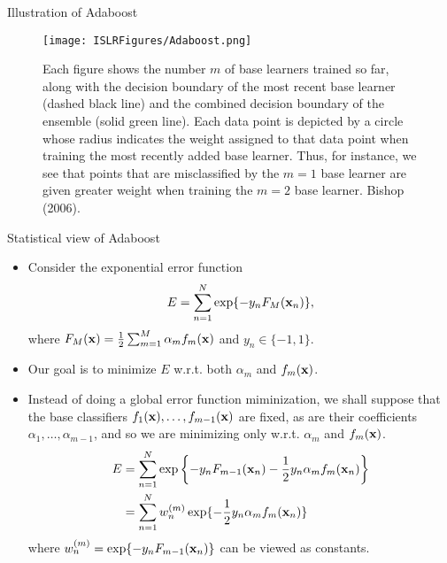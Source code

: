 \documentclass{beamer}
\def\bfx{{\bf x}}
\begin{document}
                     \begin{frame}{Illustration of Adaboost}

                      \begin{figure}
                        \centering
                        
                        \centering
                        \texttt{[image: ISLRFigures/Adaboost.png]}
                        \caption{\footnotesize Each figure shows the number $m$ of base learners trained so far, along with the decision
boundary of the most recent base learner (dashed black line) and the combined decision boundary of the ensemble
(solid green line). Each data point is depicted by a circle whose radius indicates the weight assigned to
that data point when training the most recently added base learner. Thus, for instance, we see that points that
are misclassified by the $m = 1$ base learner are given greater weight when training the $m = 2$ base learner. Bishop (2006).
                        }
                      \end{figure}

                     \end{frame}

                    

                     \begin{frame}{Statistical view of Adaboost}
                     \begin{itemize}\footnotesize
                      \item Consider the exponential error function 
                      \begin{align}\label{exp_loss}
                      E = \sum^N_{n=1} \exp\{-y_n F_M(\bfx_n)\},
                      \end{align}
                      where $F_M(\bfx)=\frac{1}{2}\sum^M_{m=1} \alpha_m f_m(\bfx)$ and $y_n\in \{-1,1\}$. 
                      \item Our goal is to minimize $E$ w.r.t. both $\alpha_m$ and $f_m(\bfx)$.
                      \item Instead of doing a global error function miminization, we shall suppose that the base classifiers $f_1(\bfx),\dots, f_{m-1}(\bfx)$ are fixed, as are their coefficients $\alpha_1,\dots,\alpha_{m-1}$, and so we are minimizing only w.r.t. $\alpha_m$ and $f_m(\bfx)$.
                      \begin{align}\label{E-sep}
                      E&=\sum^N_{n=1}\exp\left\{ -y_n F_{m-1}(\bfx_n) - \frac{1}{2} y_n \alpha_m f_m(\bfx_n)\right\}\nonumber\\
                      &=\sum^N_{n=1}w_n^{(m)}\exp\{-\frac{1}{2}y_n \alpha_m f_m(\bfx_n)\}
                      \end{align}
                      where $w_n^{(m)}=\exp\{-y_n F_{m-1}(\bfx_n)\}$ can be viewed as constants.
                     \end{itemize}
                     \end{frame}
                     
\end{document}
